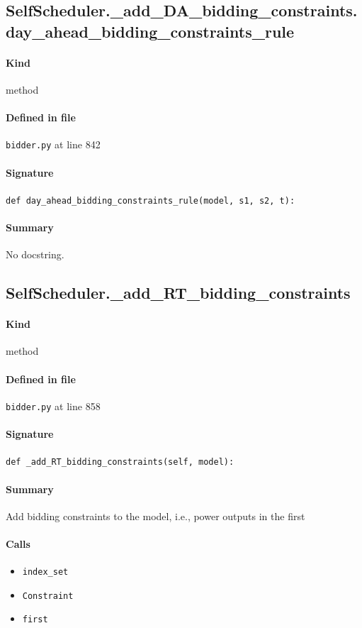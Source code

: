 \documentclass[11pt]{report}
\begin{document}
\subsection{SelfScheduler.\_add\_DA\_bidding\_constraints.day\_ahead\_bidding\_constraints\_rule}
\label{def:bidder.py:SelfScheduler._add_DA_bidding_constraints.day_ahead_bidding_constraints_rule:L842}
\paragraph{Kind} method
\paragraph{Defined in file} \texttt{bidder.py} at line 842
\paragraph{Signature} \texttt{def day\_ahead\_bidding\_constraints\_rule(model, s1, s2, t):}
\paragraph{Summary} No docstring.
\subsection{SelfScheduler.\_add\_RT\_bidding\_constraints}
\label{def:bidder.py:SelfScheduler._add_RT_bidding_constraints:L858}
\paragraph{Kind} method
\paragraph{Defined in file} \texttt{bidder.py} at line 858
\paragraph{Signature} \texttt{def \_add\_RT\_bidding\_constraints(self, model):}
\paragraph{Summary} Add bidding constraints to the model, i.e., power outputs in the first
\paragraph{Calls}
\begin{itemize}[leftmargin=*]
  \item \texttt{index\_set}
  \item \texttt{Constraint}
  \item \texttt{first}
\end{itemize}
\end{document}
